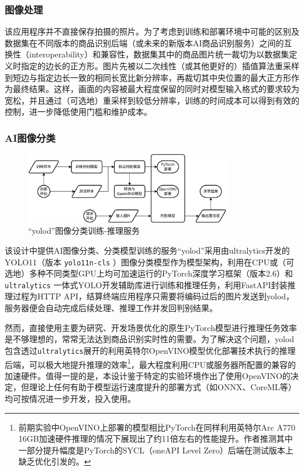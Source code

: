 \subsubsection{图像处理}

该应用程序并不直接保存拍摄的照片。为了考虑到训练和部署环境中可能的区别及数据集在不同版本的商品识别后端（或未来的新版本AI商品识别服务）之间的互换性（interoperability）和兼容性，数据集其中的商品图片统一裁切为以数据集定义时指定的边长的正方形。图片先被以二次线性（或其他更好的）插值算法重采样到短边与指定边长一致的相同长宽比新分辨率，再裁切其中央位置的最大正方形作为最终结果。这样，画面的内容被最大程度保留的同时对模型输入格式的要求较为宽松，并且通过（可选地）重采样到较低分辨率，训练的时间成本可以得到有效的控制，进一步降低使用门槛和维护成本。

\subsubsection{AI图像分类}

\begin{figure}[htbp]
	\centering
	\includegraphics[width=0.8\textwidth]{./imgs/yolod.png}
	\caption{“yolod”图像分类训练-推理服务}
	\label{fig:yolod}
\end{figure}

该设计中提供AI图像分类、分类模型训练的服务“yolod”采用由ultralytics开发的YOLO11（版本 \verb|yolo11n-cls| ）图像分类模型\cite{yolo11_ultralytics}作为模型架构，利用在CPU或（可选地）多种不同类型GPU上均可加速运行的PyTorch深度学习框架（版本2.6）和 \verb|ultralytics| 一体式YOLO开发辅助库进行训练和推理任务，利用FastAPI封装推理过程为HTTP API，结算终端应用程序只需要将编码过后的图片发送到yolod，服务器便会自动完成后续处理、推理工作并发回判别结果。

然而，直接使用主要为研究、开发场景优化的原生PyTorch模型进行推理任务效率是不够理想的，常常无法达到商品识别实时性的需要。为了解决这个问题，yolod包含透过\verb|ultralytics|展开的利用英特尔OpenVINO模型优化部署技术执行的推理后端，可以极大地提升推理的效率\footnote{前期实验中OpenVINO上部署的模型相比PyTorch在同样利用英特尔Arc A770 16GB加速硬件推理的情况下展现出了约11倍左右的性能提升。作者推测其中一部分提升幅度是PyTorch的SYCL（oneAPI Level Zero）后端在测试版本上缺乏优化引发的。}，最大程度利用CPU或服务器所配置的兼容的加速硬件。值得一提的是，本设计鉴于特定的实验环境作出了使用OpenVINO的决定，但理论上任何有助于模型运行速度提升的部署方式（如ONNX、CoreML等）均可按情况进一步开发，投入使用。

